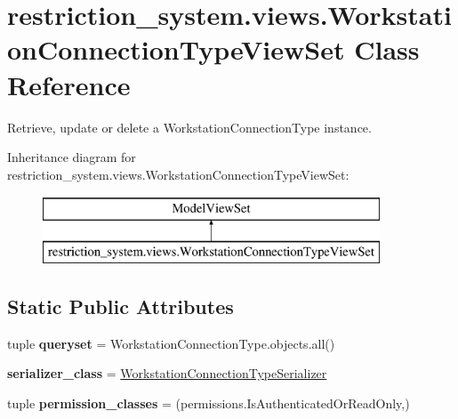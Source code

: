 \hypertarget{classrestriction__system_1_1views_1_1WorkstationConnectionTypeViewSet}{}\section{restriction\+\_\+system.\+views.\+Workstation\+Connection\+Type\+View\+Set Class Reference}
\label{classrestriction__system_1_1views_1_1WorkstationConnectionTypeViewSet}


Retrieve, update or delete a Workstation\+Connection\+Type instance.  


Inheritance diagram for restriction\+\_\+system.\+views.\+Workstation\+Connection\+Type\+View\+Set\+:\begin{figure}[H]
\begin{center}
\leavevmode
\includegraphics[height=2.000000cm]{classrestriction__system_1_1views_1_1WorkstationConnectionTypeViewSet}
\end{center}
\end{figure}
\subsection*{Static Public Attributes}
\begin{DoxyCompactItemize}
\item 
\hypertarget{classrestriction__system_1_1views_1_1WorkstationConnectionTypeViewSet_af2645899dbca1469b32aa567a1876616}{}tuple {\bfseries queryset} = Workstation\+Connection\+Type.\+objects.\+all()\label{classrestriction__system_1_1views_1_1WorkstationConnectionTypeViewSet_af2645899dbca1469b32aa567a1876616}

\item 
\hypertarget{classrestriction__system_1_1views_1_1WorkstationConnectionTypeViewSet_a27030a70d2bfeb9a50fe96f78f1a2c28}{}{\bfseries serializer\+\_\+class} = \hyperlink{classrestriction__system_1_1serializers_1_1WorkstationConnectionTypeSerializer}{Workstation\+Connection\+Type\+Serializer}\label{classrestriction__system_1_1views_1_1WorkstationConnectionTypeViewSet_a27030a70d2bfeb9a50fe96f78f1a2c28}

\item 
\hypertarget{classrestriction__system_1_1views_1_1WorkstationConnectionTypeViewSet_a74b1ba740b3595438ca0814b49a4e336}{}tuple {\bfseries permission\+\_\+classes} = (permissions.\+Is\+Authenticated\+Or\+Read\+Only,)\label{classrestriction__system_1_1views_1_1WorkstationConnectionTypeViewSet_a74b1ba740b3595438ca0814b49a4e336}

\end{DoxyCompactItemize}


